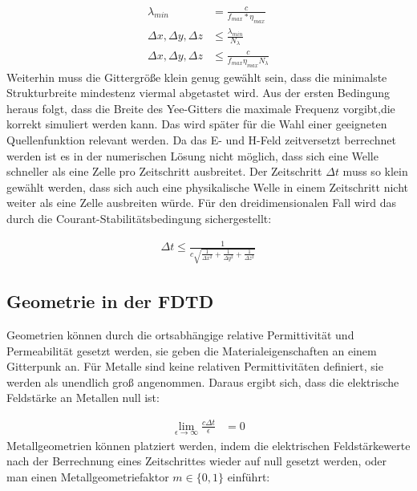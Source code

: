 \documentclass[11pt, ngerman]{article}
\begin{document}
\begin{align}
	\lambda_{min} &= \frac{c}{f_{max}*\eta_{max}}\\
	\Delta x, \Delta y, \Delta z &\leq \frac{\lambda_{min}}{N_\lambda}\\
	\Delta x, \Delta y, \Delta z &\leq \frac{c}{f_{max}\eta_{max}N_\lambda}
\end{align}
Weiterhin muss die Gittergr\"o{\ss}e klein genug gew\"ahlt sein, dass die minimalste
Strukturbreite mindestenz viermal abgetastet wird\cite{grid_stability_condition}.
Aus der ersten Bedingung heraus folgt, dass die Breite des Yee-Gitters die maximale
Frequenz vorgibt,die korrekt simuliert werden kann. Das wird sp\"ater f\"ur die
Wahl einer geeigneten Quellenfunktion relevant werden.
Da das E- und H-Feld zeitversetzt berrechnet werden ist es in der numerischen
L\"osung nicht m\"oglich, dass sich eine Welle schneller als eine Zelle pro
Zeitschritt ausbreitet. Der Zeitschritt \(\Delta t\) muss so klein gew\"ahlt werden, dass sich auch eine physikalische Welle in einem Zeitschritt nicht weiter als eine 
Zelle ausbreiten w\"urde. F\"ur den dreidimensionalen Fall wird das durch
die Courant-Stabilit\"atsbedingung sichergestellt\cite{time_stability_condition}:

\begin{align}
	\Delta t \leq \frac{1}{c\sqrt{\frac{1}{\Delta x^2} + \frac{1}{\Delta y^2} +\frac{1}{\Delta z^2}}}
\end{align}
\newpage
\subsection{Geometrie in der FDTD}
Geometrien k\"onnen durch die ortsabh\"angige relative Permittivit\"at und Permeabilit\"at gesetzt werden, sie geben die Materialeigenschaften an einem Gitterpunk an.
F\"ur Metalle sind keine relativen Permittivit\"aten definiert, sie werden als unendlich gro{\ss} angenommen.
Daraus ergibt sich, dass die elektrische Feldst\"arke an Metallen null ist:

\begin{align}
	\lim_{\epsilon\to\infty}\frac{c\Delta t}{\epsilon} &= 0
\end{align}
Metallgeometrien k\"onnen platziert werden, indem die elektrischen Feldst\"arkewerte nach der Berrechnung eines Zeitschrittes wieder auf null gesetzt
werden, oder man einen Metallgeometriefaktor \(m \in \{0, 1\}\) einf\"uhrt:
\end{document}
